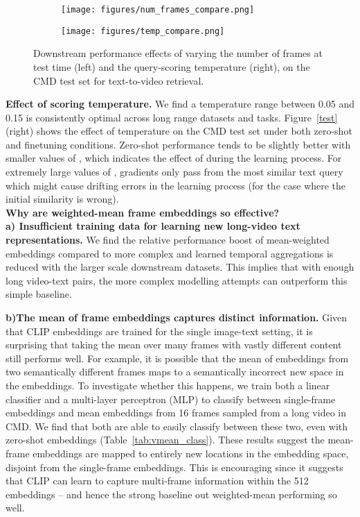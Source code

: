 \begin{figure}[t]
\centering
\begin{subfigure}{.5\textwidth}
    \centering
    \texttt{[image: figures/num\_frames\_compare.png]}
    \label{fig:cmd_num_frames}
\end{subfigure}\begin{subfigure}{.5\textwidth}
    \centering
    \texttt{[image: figures/temp\_compare.png]}
    \label{fig:cmd_temp_ablation}
\end{subfigure}
\caption{Downstream performance effects of varying the number of frames at test time (left) and the query-scoring temperature  (right), on the CMD test set for text-to-video retrieval.}
\label{fig:test}
\end{figure}

\noindent\textbf{Effect of scoring temperature.}
We find a temperature range between 0.05 and 0.15 is consistently optimal across long range datasets and tasks. Figure~\ref{test} (right) shows the effect of temperature on the CMD test set under both zero-shot and finetuning conditions. Zero-shot performance tends to be slightly better with smaller values of , which indicates the effect of  during the learning process. For extremely large values of , gradients only pass from the most similar text query which might cause drifting errors in the learning process (for the case where the initial similarity is wrong). \\

\noindent\textbf{Why are weighted-mean frame embeddings so effective?} \\

\noindent\textbf{a) Insufficient training data for learning new long-video text representations.} We find the relative performance boost of mean-weighted embeddings compared to more complex and learned temporal aggregations is reduced with the larger scale downstream datasets. This implies that with enough long video-text pairs, the more complex modelling attempts can outperform this simple baseline.

\noindent\textbf{b)The mean of frame embeddings captures distinct information.}
Given that CLIP embeddings are trained for the single image-text setting, it is surprising that taking the mean over many frames with vastly different content still performs well. For example, it is possible that the mean of embeddings from two semantically different frames maps to a semantically incorrect new space in the embeddings. To investigate whether this happens, we train both a linear classifier and a multi-layer perceptron (MLP) to classify between single-frame embeddings and mean embeddings from 16 frames sampled from a long video in CMD. We find that both are able to easily classify between these two, even with zero-shot embeddings (Table~\ref{tab:vmean_class}). These results suggest the mean-frame embeddings are mapped to entirely new locations in the embedding space, disjoint from the single-frame embeddings. This is encouraging since it suggests that CLIP can learn to capture multi-frame information within the 512 embeddings -- and hence the strong baseline out weighted-mean performing so well.


